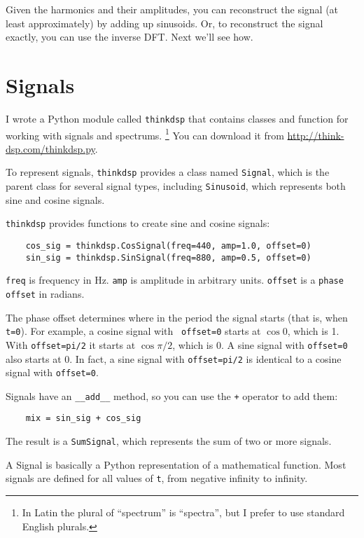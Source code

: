 \documentclass[12pt]{book}
\begin{document}
Given the harmonics and their amplitudes, you can reconstruct the
signal (at least approximately) by adding up sinusoids.  Or, to
reconstruct the signal exactly, you can use the inverse DFT.  
Next we'll see how.


\section{Signals}

I wrote a Python module called {\tt thinkdsp} that contains
classes and function for working with signals and spectrums.
\footnote{In Latin the plural of ``spectrum'' is ``spectra'', but I
prefer to use standard English plurals.}  You can download
it from \url{http://think-dsp.com/thinkdsp.py}.

To represent signals, {\tt thinkdsp} provides a class named
{\tt Signal}, which is the parent class for several signal types,
including {\tt Sinusoid}, which represents both sine and cosine
signals.

{\tt thinkdsp} provides functions to create sine and cosine signals:

\begin{verbatim}
    cos_sig = thinkdsp.CosSignal(freq=440, amp=1.0, offset=0)
    sin_sig = thinkdsp.SinSignal(freq=880, amp=0.5, offset=0)
\end{verbatim}

{\tt freq} is frequency in Hz.  {\tt amp} is amplitude in arbitrary
units.  {\tt offset} is a {\tt phase offset} in radians.

The phase offset determines where in the period the signal starts
(that is, when {\tt t=0}).  For example, a cosine signal with {\tt
  offset=0} starts at $\cos 0$, which is 1.  With {\tt offset=pi/2} it
starts at $\cos \pi/2$, which is 0.
A sine signal with
{\tt offset=0} also starts at 0.  In fact,
a sine signal with {\tt offset=pi/2} is identical to a cosine
signal with {\tt offset=0}.

Signals have an \verb"__add__" method, so you can use the {\tt +}
operator to add them:

\begin{verbatim}
    mix = sin_sig + cos_sig
\end{verbatim}

The result is a {\tt SumSignal}, which represents the sum of two
or more signals.

A Signal is basically a Python representation of a mathematical
function.  Most signals are defined for all values of {\tt t},
from negative infinity to infinity.
\end{document}

